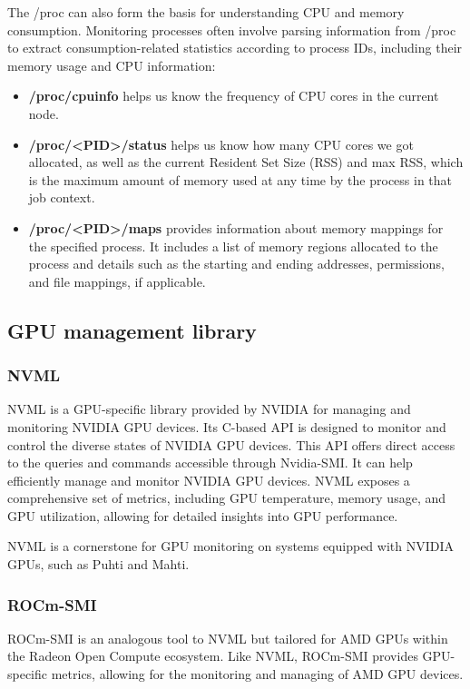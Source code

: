 The /proc can also form the basis for understanding CPU and memory consumption. Monitoring processes often involve parsing information from /proc to extract consumption-related statistics according to process IDs, including their memory usage and CPU information:

\begin{itemize}
    \item \textbf{/proc/cpuinfo} helps us know the frequency of CPU cores in the current node.
    \item \textbf{/proc/<PID>/status} helps us know how many CPU cores we got allocated, as well as the current Resident Set Size (RSS) and max RSS, which is the maximum amount of memory used at any time by the process in that job context.
    \item \textbf{/proc/<PID>/maps} provides information about memory mappings for the specified process. It includes a list of memory regions allocated to the process and details such as the starting and ending addresses, permissions, and file mappings, if applicable.
\end{itemize}

\subsection{GPU management library}
\subsubsection{NVML}
NVML \cite{nvml} is a GPU-specific library provided by NVIDIA for managing and monitoring NVIDIA GPU devices. Its C-based API is designed to monitor and control the diverse states of NVIDIA GPU devices. This API offers direct access to the queries and commands accessible through Nvidia-SMI. It can help efficiently manage and monitor NVIDIA GPU devices. NVML exposes a comprehensive set of metrics, including GPU temperature, memory usage, and GPU utilization, allowing for detailed insights into GPU performance.

NVML is a cornerstone for GPU monitoring on systems equipped with NVIDIA GPUs, such as Puhti and Mahti.

\subsubsection{ROCm-SMI}
ROCm-SMI \cite{rocm-smi} is an analogous tool to NVML but tailored for AMD GPUs within the Radeon Open Compute ecosystem. Like NVML, ROCm-SMI provides GPU-specific metrics, allowing for the monitoring and managing of AMD GPU devices.

